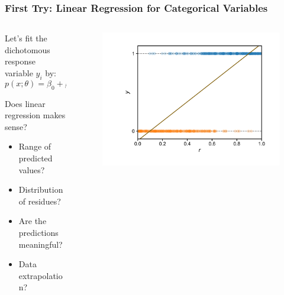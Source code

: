 \documentclass[10pt,aspectratio=169]{beamer}
\begin{document}
\begin{frame}
  \frametitle{First Try: Linear Regression for Categorical Variables}

  
  \begin{columns}[T]
    \begin{column}{0.350\textwidth}
      Let's fit the dichotomous response variable $y_{i}$ by:
  \begin{equation*}
    p(x; \theta) = \beta_{0} + \beta_{1} x
  \end{equation*}

  Does linear regression makes sense?
  \begin{itemize}
  \item Range of predicted values?
  \item Distribution of residues?
  \item Are the predictions meaningful?
  \item Data extrapolation?
  \end{itemize}
\end{column}

\begin{column}{0.65\textwidth}
  \begin{figure}[t]
    \includegraphics[width=1.1\textwidth]{scripts/coin_linear_fit.pdf}
  \end{figure}
\end{column}
  \end{columns}
\end{frame}
\end{document}
